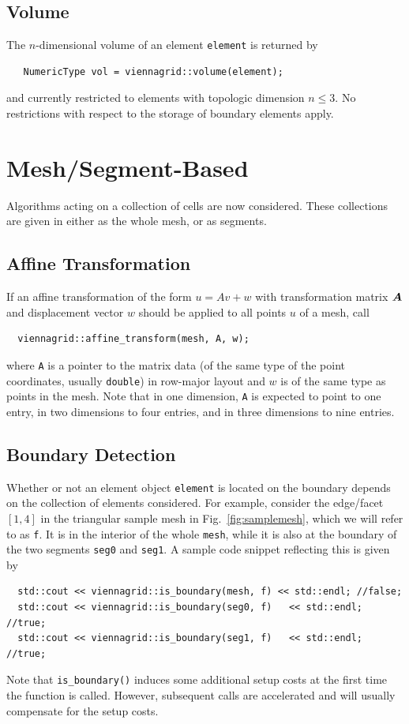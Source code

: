 
  \subsection{Volume}
  The $n$-dimensional volume of an element \lstinline|element| is returned by
  \begin{lstlisting}
   NumericType vol = viennagrid::volume(element);
  \end{lstlisting}
  and currently restricted to elements with topologic dimension $n \leq 3$. No restrictions with respect to the storage of boundary elements apply.


\section{Mesh/Segment-Based}
Algorithms acting on a collection of cells are now considered. These collections are given in {\ViennaGrid} either as the whole mesh, or as segments.

 \subsection{Affine Transformation}
 If an affine transformation of the form $u = Av + w$ with transformation matrix $\boldsymbol{A}$ and displacement vector $w$ should be applied to all points $u$ of a mesh, call
 \begin{lstlisting}
  viennagrid::affine_transform(mesh, A, w);
 \end{lstlisting}
 where \lstinline|A| is a pointer to the matrix data (of the same type of the point coordinates, usually \lstinline|double|) in row-major layout and $w$ is of the same type as points in the mesh.
 Note that in one dimension, \lstinline|A| is expected to point to one entry, in two dimensions to four entries, and in three dimensions to nine entries.

 \subsection{Boundary Detection}
 Whether or not an element object \lstinline|element| is located on the boundary depends on the collection of elements considered.
 For example, consider the edge/facet $[1,4]$ in the triangular sample mesh in Fig.~\ref{fig:samplemesh}, which we will refer to as \lstinline|f|.
 It is in the interior of the whole \lstinline|mesh|, while it is also at the boundary of the two segments \lstinline|seg0| and \lstinline|seg1|.
 A sample code snippet reflecting this is given by
 \begin{lstlisting}
  std::cout << viennagrid::is_boundary(mesh, f) << std::endl; //false;
  std::cout << viennagrid::is_boundary(seg0, f)   << std::endl; //true;
  std::cout << viennagrid::is_boundary(seg1, f)   << std::endl; //true;
 \end{lstlisting}
 Note that \lstinline|is_boundary()| induces some additional setup costs at the first time the function is called. However, subsequent calls are accelerated and will usually compensate for the setup costs.

